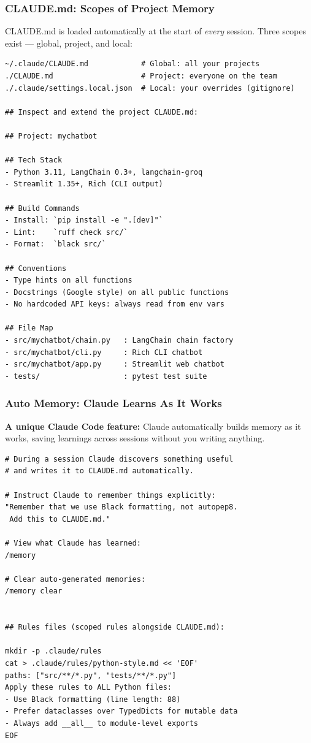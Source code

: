 \begin{frame}[fragile]\frametitle{CLAUDE.md: Scopes of Project Memory}
CLAUDE.md is loaded automatically at the start of \textit{every} session. Three scopes exist --- global, project, and local:

\begin{lstlisting}
~/.claude/CLAUDE.md            # Global: all your projects
./CLAUDE.md                    # Project: everyone on the team
./.claude/settings.local.json  # Local: your overrides (gitignore)

## Inspect and extend the project CLAUDE.md:

## Project: mychatbot

## Tech Stack
- Python 3.11, LangChain 0.3+, langchain-groq
- Streamlit 1.35+, Rich (CLI output)

## Build Commands
- Install: `pip install -e ".[dev]"`
- Lint:    `ruff check src/`
- Format:  `black src/`

## Conventions
- Type hints on all functions
- Docstrings (Google style) on all public functions
- No hardcoded API keys: always read from env vars

## File Map
- src/mychatbot/chain.py   : LangChain chain factory
- src/mychatbot/cli.py     : Rich CLI chatbot
- src/mychatbot/app.py     : Streamlit web chatbot
- tests/                   : pytest test suite
\end{lstlisting}
\end{frame}


\begin{frame}[fragile]\frametitle{Auto Memory: Claude Learns As It Works}
\textbf{A unique Claude Code feature:} Claude automatically builds memory as it works, saving learnings across sessions without you writing anything.

\begin{lstlisting}
# During a session Claude discovers something useful
# and writes it to CLAUDE.md automatically.

# Instruct Claude to remember things explicitly:
"Remember that we use Black formatting, not autopep8.
 Add this to CLAUDE.md."

# View what Claude has learned:
/memory

# Clear auto-generated memories:
/memory clear


## Rules files (scoped rules alongside CLAUDE.md):

mkdir -p .claude/rules
cat > .claude/rules/python-style.md << 'EOF'
paths: ["src/**/*.py", "tests/**/*.py"]
Apply these rules to ALL Python files:
- Use Black formatting (line length: 88)
- Prefer dataclasses over TypedDicts for mutable data
- Always add __all__ to module-level exports
EOF
\end{lstlisting}
\end{frame}


